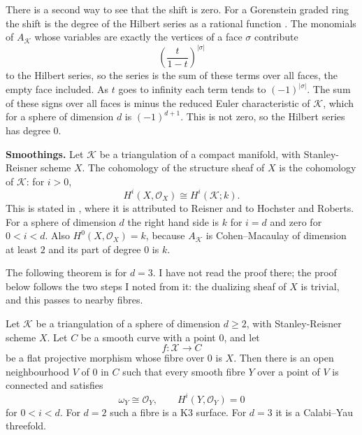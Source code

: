There is a second way to see that the shift
is zero. For a Gorenstein graded ring the
shift is the degree of the Hilbert series as
a rational function \cite[Chapter I, Theorem
12.6 and the remark after it]{stanley-cca}.
The monomials of $A_{\mathcal{K}}$ whose
variables are exactly the vertices of a face
$\sigma$ contribute
$$
\left(\frac{t}{1-t}\right)^{|\sigma|}
$$
to the Hilbert series, so the series is the
sum of these terms over all faces, the empty
face included. As $t$ goes to infinity each
term tends to $(-1)^{|\sigma|}$. The sum of
these signs over all faces is minus the
reduced Euler characteristic of
$\mathcal{K}$, which for a sphere of
dimension $d$ is $(-1)^{d+1}$. This is not
zero, so the Hilbert series has degree $0$.

\medskip\noindent
{\bf Smoothings.}
Let $\mathcal{K}$ be a triangulation of a
compact manifold, with Stanley-Reisner scheme
$X$. The cohomology of the structure sheaf of
$X$ is the cohomology of $\mathcal{K}$: for
$i>0$,
$$
H^i(X,\mathcal{O}_X)\cong
H^i(\mathcal{K};k).
$$
This is stated in \cite[Section
6]{BAYER19911}, where it is attributed to
Reisner and to Hochster and Roberts. For a
sphere of dimension $d$ the right hand side
is $k$ for $i=d$ and zero for $0<i<d$. Also
$H^0(X,\mathcal{O}_X)=k$, because
$A_{\mathcal{K}}$ is Cohen--Macaulay of
dimension at least $2$ and its part of degree
$0$ is $k$.

The following theorem is \cite[Theorem
0.2.1]{Fausk} for $d=3$. I have not read the
proof there; the proof below follows the two
steps I noted from it: the dualizing sheaf of
$X$ is trivial, and this passes to nearby
fibres.

\begin{theorem}
\label{theorem-fausk-021}
Let $\mathcal{K}$ be a triangulation of a
sphere of dimension $d\geq 2$, with
Stanley-Reisner scheme $X$. Let $C$ be a
smooth curve with a point $0$, and let
$$
f:\mathcal{X}\to C
$$
be a flat projective morphism whose fibre
over $0$ is $X$. Then there is an open
neighbourhood $V$ of $0$ in $C$ such that
every smooth fibre $Y$ over a point of $V$ is
connected and satisfies
$$
\omega_Y\cong\mathcal{O}_Y,
\qquad
H^i(Y,\mathcal{O}_Y)=0
$$
for $0<i<d$. For $d=2$ such a fibre is a K3
surface. For $d=3$ it is a Calabi--Yau
threefold.
\end{theorem}

